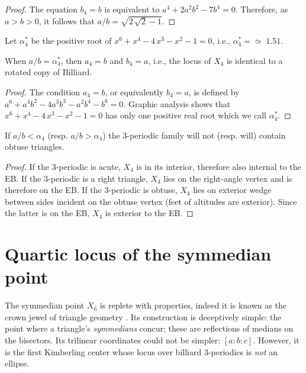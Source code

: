\begin{proof}
The equation $b_4=b$ is equivalent to $a^4+2a^2b^2-7b^4=0.$ Therefore, as $a>b>0$, it follows that $a/b=\sqrt{2\,\sqrt {2}-1}.$
\end{proof}

\noindent Let $\alpha_4^*$ be the positive root of
${x}^{6}+{x}^{4}-4\,{x}^{3}-{x}^{2}-1=0$, i.e.,
$\alpha_4^{*}={\simeq}\;1.51$. 

\begin{proposition}
When $a/b=\alpha_4^{*}$, then $a_4=b$ and $b_4=a$, i.e., the locus of $X_4$ is identical to a rotated copy of Billiard. 
\end{proposition}

\begin{proof}
The condition $a_4=b$, or equivalently $b_4=a$, is defined by $a^6+a^4b^2-4a^3b^3-a^2b^4-b^6=0$. Graphic analysis shows that ${x}^{6}+{x}^{4}-4\,{x}^{3}-{x}^{2}-1=0$ has only one positive real root which we call $\alpha_4^*$.
\end{proof}

\begin{theorem}
If $a/b<\alpha_4$ (resp. $a/b>\alpha_4$) the 3-periodic family will not (resp. will) contain obtuse triangles.
\end{theorem}

\begin{proof}
If the 3-periodic is acute, $X_4$ is in its interior, therefore also internal to the EB. If the 3-periodic is a right triangle, $X_4$ lies on the right-angle vertex and is therefore on the EB. If the 3-periodic is obtuse, $X_4$ lies on exterior wedge between sides incident on the obtuse vertex (feet of altitudes are exterior). Since the latter is on the EB, $X_4$ is exterior to the EB.
\end{proof}

\section{Quartic locus of the symmedian point }
\label{sec:symmedian}

The symmedian point $X_6$ is replete with properties, indeed it is known as the crown jewel of triangle geometry \cite[Symmedian Point]{mw}. Its construction is deceptively simple: the point where a triangle's {\em symmedians} concur; these are reflections of medians on the bisectors. Its trilinear coordinates could not be simpler: $[a:b:c]$. However, it is the first Kimberling center whose locus over billiard 3-periodics is {\em not} an ellipse. 

